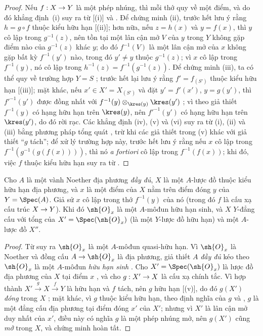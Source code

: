\documentclass[oneside,10pt]{amsart}
\makeatletter
\newcommand{\ega@arrow}[2]{\mathchoice{#1}{#2}{#2}{#2}}
\renewcommand{\to}{\ega@arrow{\longrightarrow}{\rightarrow}}
\newcommand{\oldpage}[2][]{\marginnote{\normalfont\footnotesize\textbf{#1}~|~#2}\ignorespaces}
\let\EGAOriginalLabel\label
\renewcommand{\label}[1]{\phantomsection\EGAOriginalLabel{#1}}
\makeatother
\begin{document}
\begin{proof}
Nếu $f:X\to Y$ là một phép nhúng, thì mỗi thớ quy về một điểm, và do đó khẳng định~(i) suy ra từ [(i)] và .
Để chứng minh (ii), trước hết lưu ý rằng $h=g\circ f$ thuộc kiểu hữu hạn [(ii)];
hơn nữa, nếu $z=h(x)$ và $y=f(x)$, thì $y$ cô lập trong $g^{-1}(z)$, nên tồn tại một lân cận mở $V$ của $y$ trong $Y$ không gặp điểm nào của $g^{-1}(z)$ khác $y$;
do đó $f^{-1}(V)$ là một lân cận mở của $x$ không gặp bất kỳ
\oldpage[II]{116}
$f^{-1}(y')$ nào, trong đó $y'\neq y$ thuộc $g^{-1}(z)$;
vì $x$ cô lập trong $f^{-1}(y)$, nó cô lập trong $h^{-1}(z)=f^{-1}(g^{-1}(z))$.
Để chứng minh (iii), ta có thể quy về trường hợp $Y=S$ ;
trước hết lại lưu ý rằng $f'=f_{(S')}$ thuộc kiểu hữu hạn [(iii)];
mặt khác, nếu $x'\in X'=X_{(S')}$ và đặt $y'=f'(x')$, $y=g(y')$, thì ${f'}^{-1}(y')$ được đồng nhất với $f^{-1}(y)\otimes_{\kres(y)}\kres(y')$ ;
vì theo giả thiết $f^{-1}(y)$ có hạng hữu hạn trên $\kres(y)$, nên ${f'}^{-1}(y')$ có hạng hữu hạn trên $\kres(y')$, do đó rời rạc.
Các khẳng định (iv), (v) và (vi) suy ra từ (i), (ii) và (iii) bằng phương pháp tổng quát , trừ khi các giả thiết trong (v) khác với giả thiết ``$g$ tách'';
để xử lý trường hợp này, trước hết lưu ý rằng nếu $x$ cô lập trong $f^{-1}(g^{-1}(g(f(x))))$, thì nó \emph{a fortiori} cô lập trong $f^{-1}(f(x))$;
khi đó, việc $f$ thuộc kiểu hữu hạn suy ra từ .
\end{proof}

\begin{proposition}[6.2.5]
\label{II.6.2.5}
Cho $A$ là một vành Noether địa phương \emph{đầy đủ}, $X$ là một $A$-lược đồ thuộc kiểu hữu hạn địa phương, và $x$ là một điểm của $X$ nằm trên điểm đóng $y$ của $Y=\Spec(A)$.
Giả sử $x$ cô lập trong thớ $f^{-1}(y)$ của nó (trong đó $f$ là cấu xạ cấu trúc $X\to Y$).
Khi đó $\sh{O}_x$ là một $A$-môđun hữu hạn sinh, và $X$ $Y$-đẳng cấu với tổng  của $X'=\Spec(\sh{O}_x)$ (là một $Y$-lược đồ hữu hạn) và một $A$-lược đồ $X''$.
\end{proposition}

\begin{proof}
Từ  suy ra $\sh{O}_x$ là một $A$-môđun quasi-hữu hạn.
Vì $\sh{O}_x$ là Noether  và đồng cấu $A\to\sh{O}_x$ là địa phương, giả thiết $A$ \emph{đầy đủ} kéo theo $\sh{O}_x$ là một $A$-môđun \emph{hữu hạn sinh} .
Cho $X'=\Spec(\sh{O}_x)$ là lược đồ địa phương của $X$ tại điểm $x$ , và cho $g:X'\to X$ là cấu xạ chính tắc.
Vì hợp thành $X'\xrightarrow{g}X\xrightarrow{f}Y$ là hữu hạn  và $f$ tách, nên $g$ hữu hạn [(v)], do đó $g(X')$ \emph{đóng} trong $X$ ;
mặt khác, vì $g$ thuộc kiểu hữu hạn, theo định nghĩa của $g$ và , $g$ là một đẳng cấu địa phương tại điểm đóng $x'$ của $X'$;
nhưng vì $X'$ là lân cận mở duy nhất của $x'$, điều này có nghĩa $g$ là một phép nhúng mở, nên $g(X')$ cũng \emph{mở} trong $X$, và chứng minh hoàn tất.
\end{proof}
\end{document}
